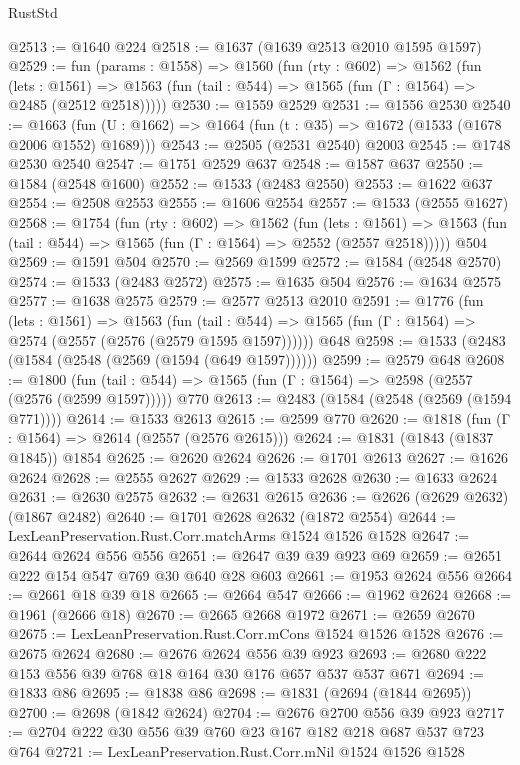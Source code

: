 \begin{lexlean}{RustStd}
\begin{coremodule}
@2513 := @1640 @224
@2518 := @1637 (@1639 @2513 @2010 @1595 @1597)
@2529 := fun (params : @1558) =>
  @1560
    (fun (rty : @602) =>
    @1562
      (fun (lets : @1561) =>
      @1563 (fun (tail : @544) => @1565 (fun (Γ : @1564) => @2485 (@2512 @2518)))))
@2530 := @1559 @2529
@2531 := @1556 @2530
@2540 := @1663 (fun (U : @1662) => @1664 (fun (t : @35) => @1672 (@1533 (@1678 @2006 @1552) @1689)))
@2543 := @2505 (@2531 @2540) @2003
@2545 := @1748 @2530 @2540
@2547 := @1751 @2529 @637
@2548 := @1587 @637
@2550 := @1584 (@2548 @1600)
@2552 := @1533 (@2483 @2550)
@2553 := @1622 @637
@2554 := @2508 @2553
@2555 := @1606 @2554
@2557 := @1533 (@2555 @1627)
@2568 := @1754
    (fun (rty : @602) =>
    @1562
      (fun (lets : @1561) =>
      @1563 (fun (tail : @544) => @1565 (fun (Γ : @1564) => @2552 (@2557 @2518)))))
    @504
@2569 := @1591 @504
@2570 := @2569 @1599
@2572 := @1584 (@2548 @2570)
@2574 := @1533 (@2483 @2572)
@2575 := @1635 @504
@2576 := @1634 @2575
@2577 := @1638 @2575
@2579 := @2577 @2513 @2010
@2591 := @1776
    (fun (lets : @1561) =>
    @1563
      (fun (tail : @544) => @1565 (fun (Γ : @1564) => @2574 (@2557 (@2576 (@2579 @1595 @1597))))))
    @648
@2598 := @1533 (@2483 (@1584 (@2548 (@2569 (@1594 (@649 @1597))))))
@2599 := @2579 @648
@2608 := @1800
    (fun (tail : @544) => @1565 (fun (Γ : @1564) => @2598 (@2557 (@2576 (@2599 @1597)))))
    @770
@2613 := @2483 (@1584 (@2548 (@2569 (@1594 @771))))
@2614 := @1533 @2613
@2615 := @2599 @770
@2620 := @1818 (fun (Γ : @1564) => @2614 (@2557 (@2576 @2615)))
@2624 := @1831 (@1843 (@1837 @1845)) @1854
@2625 := @2620 @2624
@2626 := @1701 @2613
@2627 := @1626 @2624
@2628 := @2555 @2627
@2629 := @1533 @2628
@2630 := @1633 @2624
@2631 := @2630 @2575
@2632 := @2631 @2615
@2636 := @2626 (@2629 @2632) (@1867 @2482)
@2640 := @1701 @2628 @2632 (@1872 @2554)
@2644 := LexLeanPreservation.Rust.Corr.matchArms @1524 @1526 @1528
@2647 := @2644 @2624 @556 @556
@2651 := @2647 @39 @39 @923 @69
@2659 := @2651 @222 @154 @547 @769 @30 @640 @28 @603
@2661 := @1953 @2624 @556
@2664 := @2661 @18 @39 @18
@2665 := @2664 @547
@2666 := @1962 @2624
@2668 := @1961 (@2666 @18)
@2670 := @2665 @2668 @1972
@2671 := @2659 @2670
@2675 := LexLeanPreservation.Rust.Corr.mCons @1524 @1526 @1528
@2676 := @2675 @2624
@2680 := @2676 @2624 @556 @39 @923
@2693 := @2680 @222 @153 @556 @39 @768 @18 @164 @30 @176 @657 @537 @537 @671
@2694 := @1833 @86
@2695 := @1838 @86
@2698 := @1831 (@2694 (@1844 @2695))
@2700 := @2698 (@1842 @2624)
@2704 := @2676 @2700 @556 @39 @923
@2717 := @2704 @222 @30 @556 @39 @760 @23 @167 @182 @218 @687 @537 @723 @764
@2721 := LexLeanPreservation.Rust.Corr.mNil @1524 @1526 @1528

\end{coremodule}
\end{lexlean}
